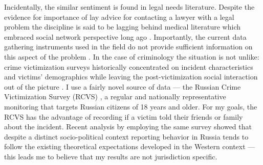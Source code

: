 \documentclass[]{interact}
\theoremstyle{plain}%
\theoremstyle{definition}
\theoremstyle{remark}
\newcommand\citep{\parencite}
\newcommand\citet{\textcite}
\begin{document}
	Incidentally, the similar sentiment is found in legal needs literature. Despite the evidence for importance of lay advice for contacting a lawyer with a legal problem \citep{ogp2019access} the discipline is said to be lagging behind medical literature which embraced social network perspective long ago  \citep{buck2010community}. Importantly, the current data gathering instruments used in the field do not provide sufficient information on this aspect of the problem \citep{abf2025access}. In the case of criminology the situation is not unlike: crime victimization surveys historically concentrated on incident characteristics and victims' demographics while leaving the post-victimization social interaction out of the picture \citep{xie2019crime}. I use a fairly novel source of data --- the Russian Crime Victimization Survey (RCVS) \citep{kuchakov2026rcvs}, a regular and nationally representative monitoring that targets Russian citizens of 18 years and older. For my goals, the RCVS has the advantage of recording if a victim told their friends or family about the incident. Recent analysis by \citet{dzmitryieva2025crime} employing the same survey showed that despite a distinct socio-political context reporting behavior in Russia tends to follow the existing theoretical expectations developed in the Western context --- this leads me to believe that my results are not jurisdiction specific.
	
\end{document}
